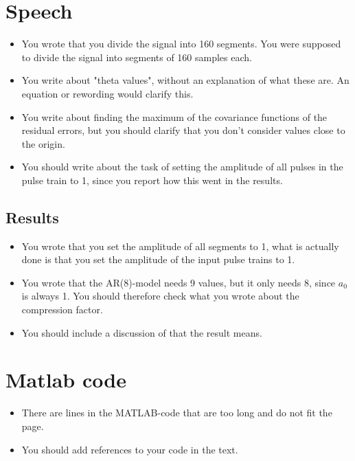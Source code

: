 \documentclass[a4paper]{article}
\begin{document}
\section{Speech}

\begin{itemize}
    \item You wrote that you divide the signal into 160 segments.
        You were supposed to divide the signal into segments of 160
        samples each.
    \item You write about "theta values", without an explanation
        of what these are. An equation or rewording would clarify this.
    \item You write about finding the maximum of the covariance functions
        of the residual errors,
        but you should clarify that you don't consider values close
        to the origin.
    \item You should write about the task of setting the amplitude
        of all pulses in the pulse train to 1, since you report
        how this went in the results.
\end{itemize}

\subsection{Results}

\begin{itemize}
    \item You wrote that you set the amplitude of all segments to 1,
        what is actually done is that you set the amplitude of the
        input pulse trains to 1.
    \item You wrote that the AR(8)-model needs 9 values, but it
        only needs 8, since $a_0$ is always 1. You should therefore
        check what you wrote about the compression factor.
    \item You should include a discussion of that the result means.
\end{itemize}

\section{Matlab code}

\begin{itemize}
    \item There are lines in the MATLAB-code that are too long and
        do not fit the page.
    \item You should add references to your code in the text.
\end{itemize}
\end{document}
